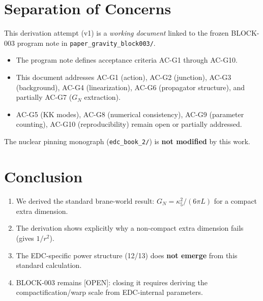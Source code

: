 \documentclass[11pt,a4paper]{article}
\newcommand{\tagOPEN}{\textcolor{red!70!black}{[OPEN]}}
\begin{document}
\section{Separation of Concerns}
\label{sec:separation}

This derivation attempt (v1) is a \emph{working document} linked to the frozen BLOCK-003 program note in \texttt{paper\_gravity\_block003/}.

\begin{itemize}[nosep]
    \item The program note defines acceptance criteria AC-G1 through AC-G10.
    \item This document addresses AC-G1 (action), AC-G2 (junction), AC-G3 (background), AC-G4 (linearization), AC-G6 (propagator structure), and partially AC-G7 ($G_N$ extraction).
    \item AC-G5 (KK modes), AC-G8 (numerical consistency), AC-G9 (parameter counting), AC-G10 (reproducibility) remain open or partially addressed.
\end{itemize}

The nuclear pinning monograph (\texttt{edc\_book\_2/}) is \textbf{not modified} by this work.

\section{Conclusion}
\label{sec:conclusion}

\begin{enumerate}
    \item We derived the standard brane-world result: $G_N = \kappa_5^2 / (6\pi L)$ for a compact extra dimension.
    \item The derivation shows explicitly why a non-compact extra dimension fails (gives $1/r^2$).
    \item The EDC-specific power structure (12/13) does \textbf{not emerge} from this standard calculation.
    \item BLOCK-003 remains \tagOPEN{}: closing it requires deriving the compactification/warp scale from EDC-internal parameters.
\end{enumerate}

\end{document}
